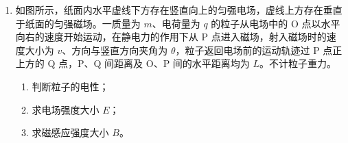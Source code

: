 \documentclass[\gkver]{gaokaozhenti}
\begin{document}
\begin{enumerate}
{（2）小车与物块在 C 点碰撞，在水平方向由动量守恒，有
$mv_{0} = (M + m)v$

代入数据，联立解得 $v = 1.2 \Ums$

（3）组合体水平方向受动摩擦力作用，从 C 点匀减速运动至 D 点静止，由动能定理，有
$-\mu(M + m)gx = 0 - \frac{1}{2}(M + m)v^{2}$

代入数据，联立解得 $\mu = 0.36$
}

\item
如图所示，纸面内水平虚线下方存在竖直向上的匀强电场，虚线上方存在垂直于纸面的匀强磁场。一质量为 $m$、电荷量为 $q$ 的粒子从电场中的 O 点以水平向右的速度开始运动，在静电力的作用下从 P 点进入磁场，射入磁场时的速度大小为 $v$、方向与竖直方向夹角为 $\theta$，粒子返回电场前的运动轨迹过 P 点正上方的 Q 点，P、Q 间距离及 O、P 间的水平距离均为 $L$。不计粒子重力。
\begin{enumerate}
\item
判断粒子的电性；
\item
求电场强度大小 $E$；
\item
求磁感应强度大小 $B$。
\end{enumerate}


\end{enumerate}
\end{document}
